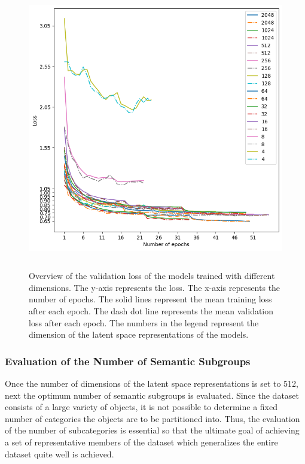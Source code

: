 \begin{figure}[H]
  \centering
  \includegraphics[width=400pt,height=350pt]{pictures/loss.png}
  \caption{Overview of the validation loss of the models trained with different dimensions. The y-axis represents the loss. The x-axis represents the number of epochs. The solid lines represent the mean training loss after each epoch. The dash dot line represents the mean validation loss after each epoch. The numbers in the legend represent the dimension of the latent space representations of the models. }
  \label{fig:loss}
\end{figure} 
 
\subsubsection{Evaluation of the Number of Semantic Subgroups}
\label{sec:conclu_pointnet_semantic}
Once the number of dimensions of the latent space representations is set to 512, next the optimum number of semantic subgroups is evaluated. Since the dataset consists of a large variety of objects, it is not possible to determine a fixed number of categories the objects are to be partitioned into. Thus, the evaluation of the number of subcategories is essential so that the ultimate goal of achieving a set of representative members of the dataset which generalizes the entire dataset quite well is achieved. 

